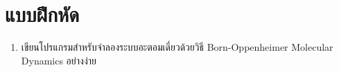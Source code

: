 \section{แบบฝึกหัด}

\begin{enumerate}[topsep=0pt,noitemsep]
  \setlength\itemsep{1em}
  \item เขียนโปรแกรมสำหรับจำลองระบบอะตอมเดี่ยวด้วยวิธี Born-Oppenheimer Molecular Dynamics อย่างง่าย
\end{enumerate}
